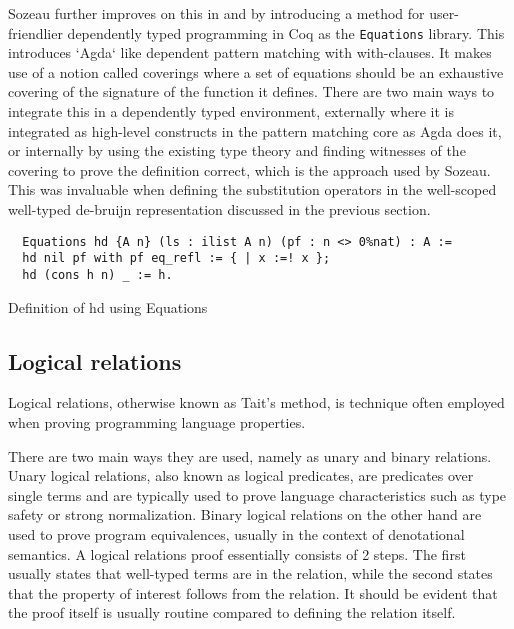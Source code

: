 \documentclass[a4, 12pt, final]{article}
\begin{document}
Sozeau further improves on this in \cite{Sozeau2010} and \cite{Sozeau2019} by introducing a method for user-friendlier dependently typed programming in Coq as the \texttt{Equations} library.
This introduces `Agda` like dependent pattern matching with with-clauses.
It makes use of a notion called coverings where a set of equations should be an exhaustive covering of the signature of the function it defines.
There are two main ways to integrate this in a dependently typed environment, externally where it is integrated as high-level constructs in the pattern matching core as Agda does it, or internally by using the existing type theory and finding witnesses of the covering to prove the definition correct, which is the approach used by Sozeau.
This was invaluable when defining the substitution operators in the well-scoped well-typed de-bruijn representation discussed in the previous section.

\begin{listing}
  \begin{verbatim}
  Equations hd {A n} (ls : ilist A n) (pf : n <> 0%nat) : A :=
  hd nil pf with pf eq_refl := { | x :=! x };
  hd (cons h n) _ := h.
  \end{verbatim}
  \caption{Definition of hd using Equations}
  \label{lst:dt_ilist_hd_equations}
\end{listing}


\subsection{Logical relations}

Logical relations, otherwise known as Tait's method, is technique often employed when proving programming language properties\cite{skorstengaard2019introduction}.

There are two main ways they are used, namely as unary and binary relations.
Unary logical relations, also known as logical predicates, are predicates over single terms and are typically used to prove language characteristics such as type safety or strong normalization.
Binary logical relations on the other hand are used to prove program equivalences, usually in the context of denotational semantics.
A logical relations proof essentially consists of 2 steps.
The first usually states that well-typed terms are in the relation, while the second states that the property of interest follows from the relation.
It should be evident that the proof itself is usually routine compared to defining the relation itself.
\end{document}
